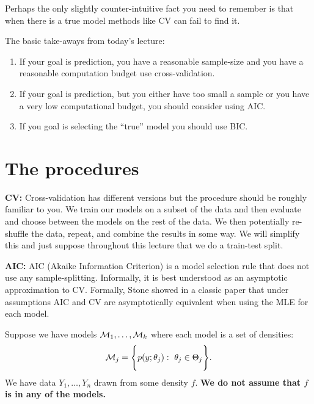 \documentclass[twoside,12pt]{article}
\begin{document}
Perhaps the only slightly counter-intuitive fact you need to remember is that when there is a true model methods like CV can fail to find it.

The basic take-aways from today's lecture:
\begin{enumerate}
\item If your goal is prediction, you have a reasonable sample-size and you have a reasonable computation budget use cross-validation.
\item If your goal is prediction, but you either have too small a sample or you have a very low computational budget, you should consider using AIC.
\item If you goal is selecting the ``true'' model you should use BIC.
\end{enumerate}

\section{The procedures}

{\bf CV: }Cross-validation has different versions but the procedure should be roughly familiar to you. We train our models on a subset of the data and then evaluate and choose between the models on the rest of the data. We then potentially re-shuffle the data, repeat, and combine the results in some way. We will simplify this and just suppose throughout this lecture that we do a train-test split.

{\bf AIC: } AIC (Akaike Information Criterion) is a model selection rule that does not use any sample-splitting. Informally, it is best understood as an asymptotic approximation to CV. Formally, Stone showed in a classic paper that under assumptions AIC and CV are asymptotically equivalent when using the MLE for each model.

Suppose we have models
${\cal M}_1, \ldots, {\cal M}_k$
where each model is a set of densities:
$$
{\cal M}_j = \Biggl\{  p(y;\theta_j):\ \theta_j\in\Theta_j \Biggr\}.
$$
We have data
$Y_1,\ldots, Y_n$ drawn from some density $f$.
{\bf We do not assume that $f$ is in any of the models.}
\end{document}
